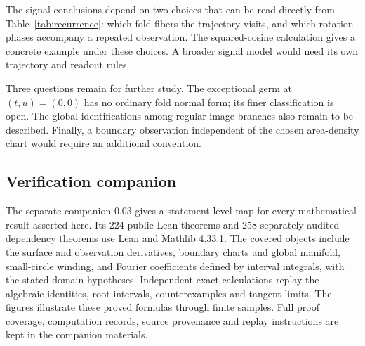 \documentclass[11pt,a4paper]{article}
\theoremstyle{definition}\newtheorem{definition}[theorem]{Definition}
\theoremstyle{remark}\newtheorem{remark}[theorem]{Remark}
\begin{document}
The signal conclusions depend on two choices that can be read directly
from Table~\ref{tab:recurrence}: which fold fibers the trajectory visits,
and which rotation phases accompany a repeated observation. The
squared-cosine calculation gives a concrete example under these choices.
A broader signal model would need its own trajectory and readout rules.

Three questions remain for further study. The exceptional germ at
$(t,u)=(0,0)$ has no ordinary fold normal form; its finer classification
is open. The global identifications among regular image branches also
remain to be described. Finally, a boundary observation independent of
the chosen area-density chart would require an additional convention.

\subsection*{Verification companion}
The separate companion 0.03 \cite{companion} gives a statement-level map
for every mathematical result asserted here. Its 224 public Lean theorems
and 258 separately audited dependency theorems use Lean and Mathlib 4.33.1.
The covered objects include the surface and observation derivatives,
boundary charts and global manifold, small-circle winding, and Fourier
coefficients defined by interval integrals, with the stated domain hypotheses.
Independent exact calculations replay the algebraic identities, root
intervals, counterexamples and tangent limits. The figures illustrate these
proved formulas through finite samples. Full proof coverage, computation
records, source provenance and replay instructions are kept in the companion
materials.
\end{document}
